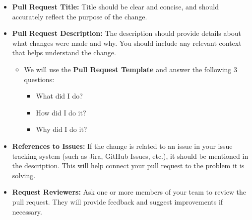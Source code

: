 \documentclass{article}
\providecommand{\tightlist}{
  \setlength{\itemsep}{0pt}\setlength{\parskip}{0pt}}
\begin{document}
\begin{itemize}
\tightlist
\item
  \textbf{Pull Request Title:} Title should be clear and concise, and
  should accurately reflect the purpose of the change.
\item
  \textbf{Pull Request Description:} The description should provide
  details about what changes were made and why. You should include any
  relevant context that helps understand the change.

  \begin{itemize}
  \tightlist
  \item
    We will use the \textbf{Pull Request Template} and answer the
    following 3 questions:

    \begin{itemize}
    \tightlist
    \item
      What did I do?
    \item
      How did I do it?
    \item
      Why did I do it?
    \end{itemize}
  \end{itemize}
\item
  \textbf{References to Issues:} If the change is related to an issue in
  your issue tracking system (such as Jira, GitHub Issues, etc.), it
  should be mentioned in the description. This will help connect your
  pull request to the problem it is solving.
\item
  \textbf{Request Reviewers:} Ask one or more members of your team to
  review the pull request. They will provide feedback and suggest
  improvements if necessary.
\end{itemize}
\end{document}
